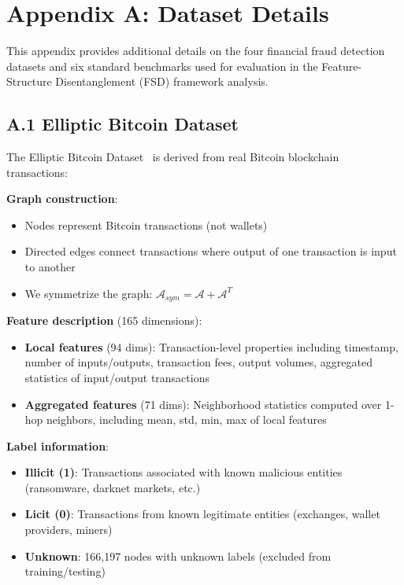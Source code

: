 \section*{Appendix A: Dataset Details}

This appendix provides additional details on the four financial fraud detection datasets and six standard benchmarks used for evaluation in the Feature-Structure Disentanglement (FSD) framework analysis.

\subsection*{A.1 Elliptic Bitcoin Dataset}

The Elliptic Bitcoin Dataset~\cite{weber2019anti} is derived from real Bitcoin blockchain transactions:

\textbf{Graph construction}:
\begin{itemize}
\item Nodes represent Bitcoin transactions (not wallets)
\item Directed edges connect transactions where output of one transaction is input to another
\item We symmetrize the graph: $\mathcal{A}_{sym} = \mathcal{A} + \mathcal{A}^T$
\end{itemize}

\textbf{Feature description} (165 dimensions):
\begin{itemize}
\item \textbf{Local features} (94 dims): Transaction-level properties including timestamp, number of inputs/outputs, transaction fees, output volumes, aggregated statistics of input/output transactions
\item \textbf{Aggregated features} (71 dims): Neighborhood statistics computed over 1-hop neighbors, including mean, std, min, max of local features
\end{itemize}

\textbf{Label information}:
\begin{itemize}
\item \textbf{Illicit (1)}: Transactions associated with known malicious entities (ransomware, darknet markets, etc.)
\item \textbf{Licit (0)}: Transactions from known legitimate entities (exchanges, wallet providers, miners)
\item \textbf{Unknown}: 166,197 nodes with unknown labels (excluded from training/testing)
\end{itemize}

